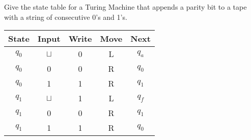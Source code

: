 \documentclass[addpoints,12pt]{exam}
\begin{document}
\begin{questions}
\begin{solution}
  \end{solution}


\question
  Give the state table for a Turing Machine that appends a parity bit to a tape with a string of consecutive 0's and 1's.
  \begin{solution}
    \begin{table}[H]
      \centering
      \begin{tabular}{ccccc}
        \toprule
            State & Input & Write & Move & Next \\
        \midrule
            $q_0$ & $\sqcup$ & 0 & L & $q_a$ \\
            $q_0$ & 0 & 0 & R & $q_0$ \\
            $q_0$ & 1 & 1 & R & $q_1$ \\
        \midrule
            $q_1$ & $\sqcup$ & 1 & L & $q_f$ \\
            $q_1$ & 0 & 0 & R & $q_1$ \\
            $q_1$ & 1 & 1 & R & $q_0$ \\
        \bottomrule
        \hline
      \end{tabular}
    \end{table}
  \end{solution}



\end{questions}
\end{document}
